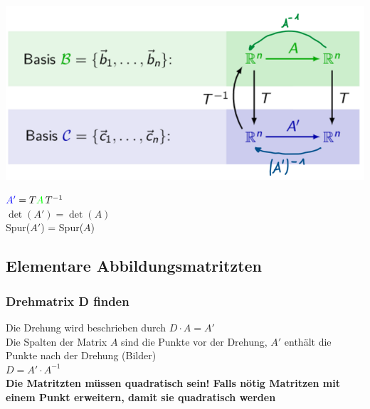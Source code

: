			\begin{minipage}{0.6\linewidth}
			\includegraphics[width=0.9\linewidth]{Bilder/basiswechsel_abbildungen}
			\end{minipage}						
			\hfill
			\begin{minipage}{0.35\linewidth}
			$\textcolor{blue}{A'} = T \textcolor{green}A \,T^{-1}$ \\
			$\det(A') = \det(A)$ \\
			Spur($A'$) = Spur($A$)	
			\end{minipage}
	
		  	
		  	\subsection{Elementare Abbildungsmatritzten}
		  	\subsubsection{Drehmatrix D finden}
			Die Drehung wird beschrieben durch $D \cdot A = A'$		  	 \\
			Die Spalten der Matrix $A$ sind die Punkte vor der Drehung, $A'$ enthält die Punkte nach der Drehung (Bilder)\\
			$D = A' \cdot A^{-1}$ \\
			\textbf{Die Matritzten müssen quadratisch sein! Falls nötig Matritzen mit einem Punkt erweitern, damit sie quadratisch werden}
		  	
		  	
